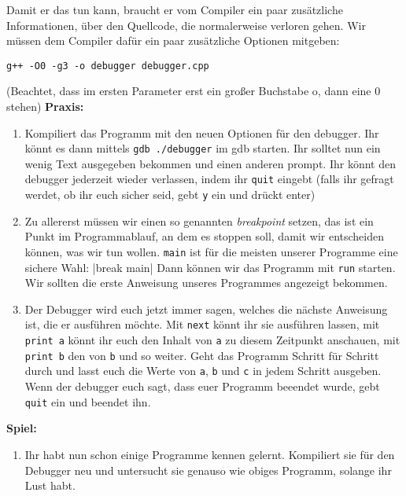 Damit er das tun kann, braucht er vom Compiler ein paar zusätzliche
Informationen, über den Quellcode, die normalerweise verloren gehen. Wir müssen
dem Compiler dafür ein paar zusätzliche Optionen mitgeben:
\begin{verbatim}
g++ -O0 -g3 -o debugger debugger.cpp
\end{verbatim}
(Beachtet, dass im ersten Parameter erst ein großer Buchstabe o, dann eine 0 stehen)
\textbf{Praxis:}
\begin{enumerate}
    \item Kompiliert das Programm mit den neuen Optionen für den debugger. Ihr
        könnt es dann mittels \verb|gdb ./debugger| im gdb starten. Ihr solltet
        nun ein wenig Text ausgegeben bekommen und einen anderen prompt. Ihr
        könnt den debugger jederzeit wieder verlassen, indem ihr \texttt{quit}
        eingebt (falls ihr gefragt werdet, ob ihr euch sicher seid, gebt
        \texttt{y} ein und drückt enter)
    \item Zu allererst müssen wir einen so genannten \emph{breakpoint} setzen,
        das ist ein Punkt im Programmablauf, an dem es stoppen soll, damit wir
        entscheiden können, was wir tun wollen. \texttt{main} ist für die
        meisten unserer Programme eine sichere Wahl:
        |break main|
        Dann können wir das Programm mit \texttt{run} starten. Wir sollten die
        erste Anweisung unseres Programmes angezeigt bekommen.
    \item Der Debugger wird euch jetzt immer sagen, welches die nächste
        Anweisung ist, die er ausführen möchte. Mit \texttt{next} könnt ihr sie
        ausführen lassen, mit \texttt{print a} könnt ihr euch den Inhalt von
        \texttt{a} zu diesem Zeitpunkt anschauen, mit \texttt{print b} den von
        \texttt{b} und so weiter. Geht das Programm Schritt für Schritt durch
        und lasst euch die Werte von \texttt{a}, \texttt{b} und \texttt{c} in
        jedem Schritt ausgeben. Wenn der debugger euch sagt, dass euer Programm
        beeendet wurde, gebt \texttt{quit} ein und beendet ihn.
\end{enumerate}

\textbf{Spiel:}
\begin{enumerate}
    \item Ihr habt nun schon einige Programme kennen gelernt. Kompiliert sie
        für den Debugger neu und untersucht sie genauso wie obiges Programm,
        solange ihr Lust habt.
\end{enumerate}
